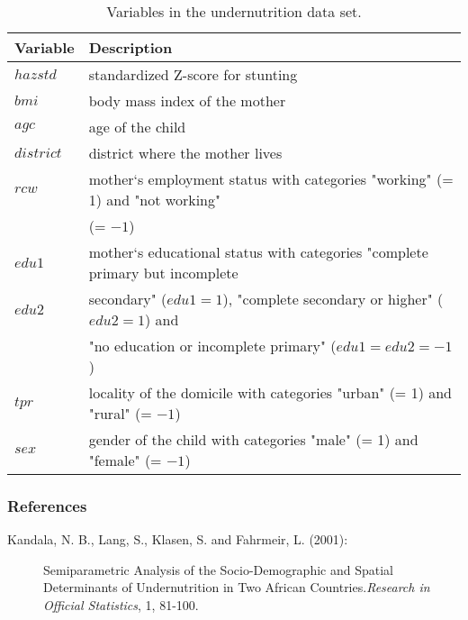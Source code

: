 \begin{table}[|h|t|]
\begin{center}
\begin{tabular}{|l|l|}
 \hline
 {\bf Variable} & {\bf Description}\\
 \hline
 $hazstd$ & standardized Z-score for stunting\\
 $bmi$ & body mass index of the mother\\
 $agc$ & age of the child\\
 $district$ & district where the mother lives\\
 $rcw$ & mother`s employment status with categories "working" (= 1) and "not working" \\
 & (= $-1$)\\
 $edu1$ & mother`s educational status with categories "complete primary but incomplete\\
 $edu2$ & secondary" ($edu1=1$), "complete secondary or higher" ($edu2=1$) and\\
 & "no education or incomplete primary" ($edu1=edu2=-1$)\\
 $tpr$ & locality of the domicile with categories "urban" (= 1) and "rural" (= $-1$)\\
 $sex$ & gender of the child with categories "male" (= 1) and
 "female" (= $-1$)\\
 \hline
\end{tabular}
{\em\caption{Variables in the undernutrition data set.
\label{zambiavar}}}
\end{center}
\end{table}

\subsubsection*{References}

\begin{description}
\item [Kandala, N. B., Lang, S., Klasen, S. and Fahrmeir, L. (2001):] Semiparametric Analysis of
the Socio-Demographic and Spatial Determinants of Undernutrition
in Two African Countries.{\it Research in Official Statistics}, 1,
81-100.
\end{description}
